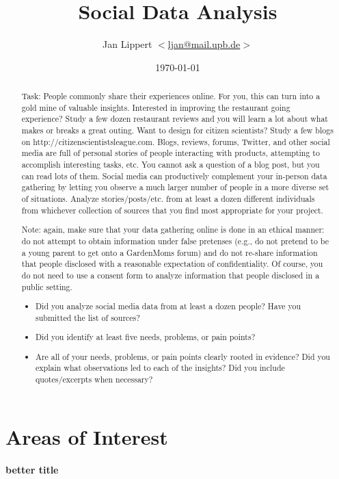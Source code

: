 \documentclass[journal,10pt]{IEEEtran}
\title{Social Data Analysis}
\author{Jan Lippert \(<\)\href{mailt:ljan@mail.upb.de}{ljan@mail.upb.de}\(>\)}
\date{\today}
\newcommand{\todo}[1]{\textbf{#1}}
\begin{document}
\begin{abstract}
Task: People commonly share their experiences online.  For you, this can turn into a gold mine of valuable insights.  Interested in improving the restaurant going experience?  Study a few dozen restaurant reviews and you will learn a lot about what makes or breaks a great outing.  Want to design for citizen scientists?  Study a few blogs on http://citizenscientistsleague.com.  Blogs, reviews, forums, Twitter, and other social media are full of personal stories of people interacting with products, attempting to accomplish interesting tasks, etc.  You cannot ask a question of a blog post, but you can read lots of them.  Social media can productively complement your in-person data gathering by letting you observe a much larger number of people in a more diverse set of situations.   Analyze stories/posts/etc. from at least a dozen different individuals from whichever collection of sources that you find most appropriate for your project.

Note: again, make sure that your data gathering online is done in an ethical manner: do not attempt to obtain information under false pretenses (e.g., do not pretend to be a young parent to get onto a GardenMoms forum) and do not re-share information that people disclosed with a reasonable expectation of confidentiality.  Of course, you do not need to use a consent form to analyze information that people disclosed in a public setting.

\begin{itemize}
  \item Did you analyze social media data from at least a dozen people?  Have you submitted the list of sources?
  \item Did you identify at least five needs, problems, or pain points?
  \item Are all of your needs, problems, or pain points clearly rooted in evidence?  Did you explain what observations led to each of the insights? Did you include quotes/excerpts when necessary?
\end{itemize}
\end{abstract}

\maketitle



\section{Areas of Interest}\todo{better title}









% 

  

\end{document}
